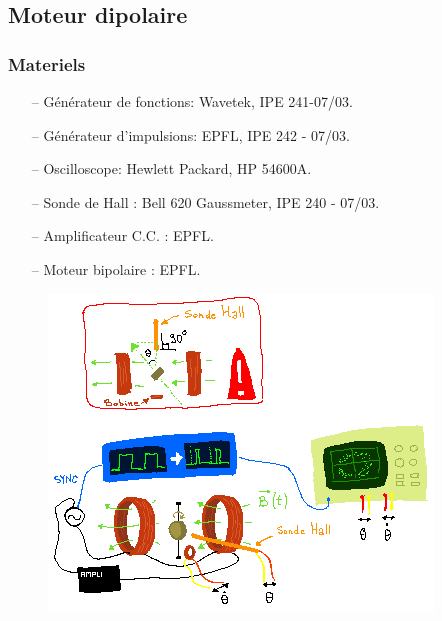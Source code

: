 \documentclass[a4paper,12pt,oneside]{article}
\begin{document}
\subsection{Moteur dipolaire}

\subsubsection{Materiels}
\begin{itemize}
  \item[--] Générateur de fonctions: Wavetek, IPE 241-07/03.
  \item[--] Générateur d’impulsions: EPFL, IPE 242 - 07/03.
  \item[--] Oscilloscope: Hewlett Packard, HP 54600A.
  \item[--] Sonde de Hall : Bell 620 Gaussmeter, IPE 240 - 07/03.
  \item[--] Amplificateur C.C. : EPFL.
  \item[--] Moteur bipolaire : EPFL.
\end{itemize}

\begin{figure}[h!]
  \begin{center}
  \includegraphics[width=1\linewidth,angle=0]{./figures/pendule_2.png}
  \caption{} \label{fig:pendule_2}
  \end{center}
\end{figure}
\end{document}

